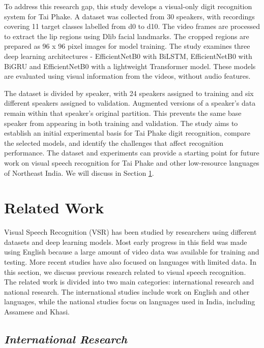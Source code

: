 \documentclass[journal]{IEEEtran}
\begin{document}
To address this research gap, this study develops a visual-only digit recognition system for Tai Phake. A dataset was collected from 30 speakers, with recordings covering 11 target classes labelled from d0 to d10. The video frames are processed to extract the lip regions using Dlib facial landmarks. The cropped regions are prepared as 96 x 96 pixel images for model training. The study examines three deep learning architectures - EfficientNetB0 with BiLSTM, EfficientNetB0 with BiGRU and EfficientNetB0 with a lightweight Transformer model. These models are evaluated using visual information from the videos, without audio features.

The dataset is divided by speaker, with 24 speakers assigned to training and six different speakers assigned to validation. Augmented versions of a speaker's data remain within that speaker's original partition. This prevents the same base speaker from appearing in both training and validation. The study aims to establish an initial experimental basis for Tai Phake digit recognition, compare the selected models, and identify the challenges that affect recognition performance. The dataset and experiments can provide a starting point for future work on visual speech recognition for Tai Phake and other low-resource languages of Northeast India. We will discuss in Section \ref{sec2}.

\section{Related Work} \label{sec2}

Visual Speech Recognition (VSR) has been studied by researchers using different datasets and deep learning models. Most early progress in this field was made using English because a large amount of video data was available for training and testing. More recent studies have also focused on languages with limited data. In this section, we discuss previous research related to visual speech recognition. The related work is divided into two main categories: international research and national research. The international studies include work on English and other languages, while the national studies focus on languages used in India, including Assamese and Khasi.

\subsection{\textit{International Research}}
\end{document}
